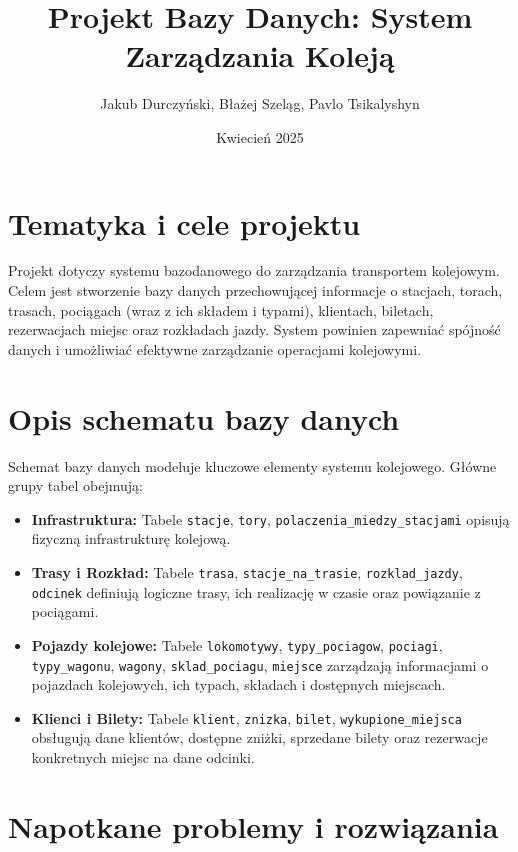 \documentclass[11pt, a4paper]{article}
\title{Projekt Bazy Danych: System Zarządzania Koleją}
\author{Jakub Durczyński, Błażej Szeląg, Pavlo Tsikalyshyn}
\date{Kwiecień 2025}
\begin{document}
\maketitle

\section{Tematyka i cele projektu}

Projekt dotyczy systemu bazodanowego do zarządzania transportem kolejowym. Celem jest stworzenie bazy danych przechowującej informacje o stacjach, torach, trasach, pociągach (wraz z ich składem i typami), klientach, biletach, rezerwacjach miejsc oraz rozkładach jazdy. System powinien zapewniać spójność danych i umożliwiać efektywne zarządzanie operacjami kolejowymi.

\section{Opis schematu bazy danych}

Schemat bazy danych modeluje kluczowe elementy systemu kolejowego. Główne grupy tabel obejmują:
\begin{itemize}
	\item \textbf{Infrastruktura:} Tabele \texttt{stacje}, \texttt{tory}, \texttt{polaczenia\_miedzy\_stacjami} opisują fizyczną infrastrukturę kolejową.
	\item \textbf{Trasy i Rozkład:} Tabele \texttt{trasa}, \texttt{stacje\_na\_trasie}, \texttt{rozklad\_jazdy}, \texttt{odcinek} definiują logiczne trasy, ich realizację w czasie oraz powiązanie z pociągami.
	\item \textbf{Pojazdy kolejowe:} Tabele \texttt{lokomotywy}, \texttt{typy\_pociagow}, \texttt{pociagi}, \texttt{typy\_wagonu}, \texttt{wagony}, \texttt{sklad\_pociagu}, \texttt{miejsce} zarządzają informacjami o pojazdach kolejowych, ich typach, składach i dostępnych miejscach.
	\item \textbf{Klienci i Bilety:} Tabele \texttt{klient}, \texttt{znizka}, \texttt{bilet}, \texttt{wykupione\_miejsca} obsługują dane klientów, dostępne zniżki, sprzedane bilety oraz rezerwacje konkretnych miejsc na dane odcinki.
\end{itemize}

\section{Napotkane problemy i rozwiązania}
\end{document}
